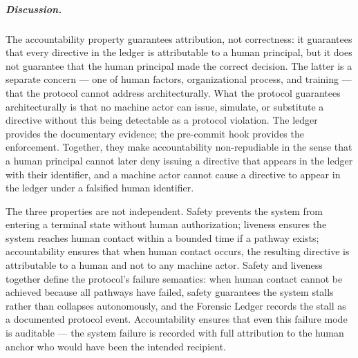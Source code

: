 \subparagraph{Discussion.} The accountability property guarantees attribution, not correctness: it guarantees that every directive in the ledger is attributable to a human principal, but it does not guarantee that the human principal made the correct decision. The latter is a separate concern — one of human factors, organizational process, and training — that the protocol cannot address architecturally. What the protocol guarantees architecturally is that no machine actor can issue, simulate, or substitute a directive without this being detectable as a protocol violation. The ledger provides the documentary evidence; the pre-commit hook provides the enforcement. Together, they make accountability non-repudiable in the sense that a human principal cannot later deny issuing a directive that appears in the ledger with their identifier, and a machine actor cannot cause a directive to appear in the ledger under a falsified human identifier.

The three properties are not independent. Safety prevents the system from entering a terminal state without human authorization; liveness ensures the system reaches human contact within a bounded time if a pathway exists; accountability ensures that when human contact occurs, the resulting directive is attributable to a human and not to any machine actor. Safety and liveness together define the protocol's failure semantics: when human contact cannot be achieved because all pathways have failed, safety guarantees the system stalls rather than collapses autonomously, and the Forensic Ledger records the stall as a documented protocol event. Accountability ensures that even this failure mode is auditable — the system failure is recorded with full attribution to the human anchor who would have been the intended recipient.